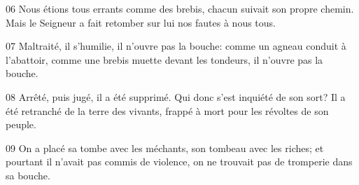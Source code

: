 
06 Nous étions tous errants comme des brebis, chacun suivait son propre chemin. Mais le Seigneur a fait retomber sur lui nos fautes à nous tous.

07 Maltraité, il s’humilie, il n’ouvre pas la bouche: comme un agneau conduit à l’abattoir, comme une brebis muette devant les tondeurs, il n’ouvre pas la bouche.

08 Arrêté, puis jugé, il a été supprimé. Qui donc s’est inquiété de son sort? Il a été retranché de la terre des vivants, frappé à mort pour les révoltes de son peuple.

09 On a placé sa tombe avec les méchants, son tombeau avec les riches; et pourtant il n’avait pas commis de violence, on ne trouvait pas de tromperie dans sa bouche.
